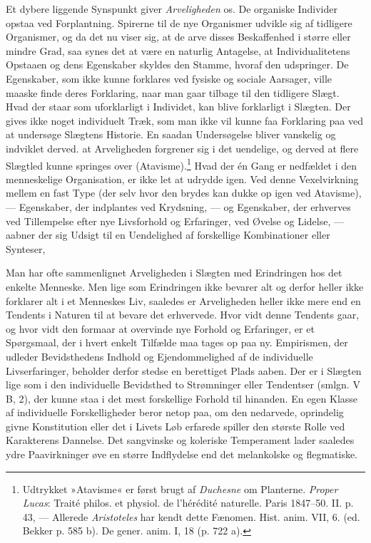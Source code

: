 \documentclass[12pt,a4paper,openany]{book}
\newcommand{\opage}[1]{\marginnote{\footnotesize\textit{[#1]}}}
\begin{document}
Et dybere liggende Synspunkt giver \emph{Arveligheden} os. De organiske
Individer opstaa ved Forplantning. Spirerne til de nye Organismer
udvikle sig af tidligere Organismer, og da
\opage{408}det nu viser sig, at de arve disses Beskaffenhed i større
eller mindre Grad, saa synes det at være en naturlig Antagelse, at
Individualitetens Opstaaen og dens Egenskaber skyldes den Stamme, hvoraf
den udspringer. De Egenskaber, som ikke kunne forklares ved fysiske og
sociale Aarsager, ville maaske finde deres Forklaring, naar man gaar
tilbage til den tidligere Slægt. Hvad der staar som uforklarligt i
Individet, kan blive forklarligt i Slægten. Der gives ikke noget
individuelt Træk, som man ikke vil kunne faa Forklaring paa ved at
undersøge Slægtens Historie. En saadan Undersøgelse bliver vanskelig og
indviklet derved. at Arveligheden forgrener sig i det uendelige, og
derved at flere Slægtled kunne springes over
(Atavisme).\footnote[1]{Udtrykket »Atavisme« er først brugt af
\emph{Duchesne} om Planterne. \emph{Proper Lucas}: Traité philos. et
physiol. de l’hérédité naturelle. Paris 1847--50. II. p. 43, --- Allerede
\emph{Aristoteles} har kendt dette Fænomen. Hist. anim. VII, 6. (ed.
Bekker p. 585 b). De gener. anim. I, 18 (p. 722 a).} Hvad der én Gang er
nedfældet i den menneskelige Organisation, er ikke let at udrydde igen.
Ved denne Vexelvirkning mellem en fast Type (der selv hvor den brydes
kan dukke op igen ved Atavisme), --- Egenskaber, der indplantes ved
Krydsning, --- og Egenskaber, der erhverves ved Tillempelse efter nye
Livsforhold og Erfaringer, ved Øvelse og Lidelse, --- aabner der sig
Udsigt til en Uendelighed af forskellige Kombinationer eller Synteser,

Man har ofte sammenlignet Arveligheden i Slægten med Erindringen hos det
enkelte Menneske. Men lige som Erindringen ikke bevarer alt og derfor
heller ikke forklarer alt i et Menneskes Liv, saaledes er Arveligheden
heller ikke mere end en Tendents i Naturen til at bevare det erhvervede.
Hvor vidt denne Tendents gaar, og hvor vidt den formaar at overvinde nye
Forhold og Erfaringer, er et Spørgsmaal, der i hvert enkelt Tilfælde maa
tages op paa ny. Empirismen, der udleder Bevidsthedens Indhold og
Ejendommelighed af de individuelle Livserfaringer, beholder derfor
stedse en berettiget Plads aaben. Der er i Slægten lige som i den
individuelle Bevidsthed to Strømninger eller Tendentser (smlgn. V B, 2),
der kunne staa i det mest forskellige Forhold til hinanden. En egen
Klasse af individuelle Forskelligheder beror netop
\opage{409}paa, om den nedarvede, oprindelig givne Konstitution eller
det i Livets Løb erfarede spiller den største Rolle ved Karakterens
Dannelse. Det sangvinske og koleriske Temperament lader saaledes ydre
Paavirkninger øve en større Indflydelse end det melankolske og
flegmatiske.
\end{document}
